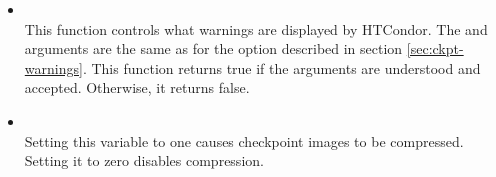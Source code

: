 \begin{itemize}
\item {}\\
This function controls what warnings are displayed by HTCondor.
The  and  arguments are the same as for the
 option described in section \ref{sec:ckpt-warnings}.  This function returns true
if the arguments are understood and accepted.  Otherwise, it returns false.

\item {}\\
Setting this variable to one causes checkpoint images to be compressed.
Setting it to zero disables compression.

\end{itemize}

